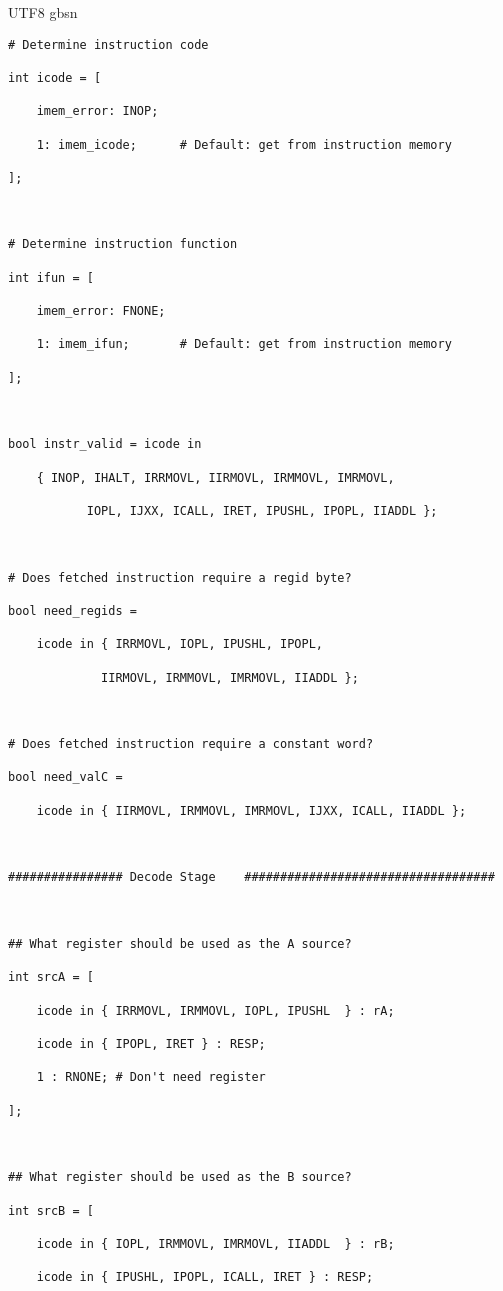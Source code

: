 \documentclass {article}
\begin{document}
\begin {CJK*} {UTF8} {gbsn}
\begin{lstlisting}
# Determine instruction code

int icode = [

	imem_error: INOP;

	1: imem_icode;		# Default: get from instruction memory

];



# Determine instruction function

int ifun = [

	imem_error: FNONE;

	1: imem_ifun;		# Default: get from instruction memory

];



bool instr_valid = icode in 

	{ INOP, IHALT, IRRMOVL, IIRMOVL, IRMMOVL, IMRMOVL,

	       IOPL, IJXX, ICALL, IRET, IPUSHL, IPOPL, IIADDL };



# Does fetched instruction require a regid byte?

bool need_regids =

	icode in { IRRMOVL, IOPL, IPUSHL, IPOPL, 

		     IIRMOVL, IRMMOVL, IMRMOVL, IIADDL };



# Does fetched instruction require a constant word?

bool need_valC =

	icode in { IIRMOVL, IRMMOVL, IMRMOVL, IJXX, ICALL, IIADDL };



################ Decode Stage    ###################################



## What register should be used as the A source?

int srcA = [

	icode in { IRRMOVL, IRMMOVL, IOPL, IPUSHL  } : rA;

	icode in { IPOPL, IRET } : RESP;

	1 : RNONE; # Don't need register

];



## What register should be used as the B source?

int srcB = [

	icode in { IOPL, IRMMOVL, IMRMOVL, IIADDL  } : rB;

	icode in { IPUSHL, IPOPL, ICALL, IRET } : RESP;


\end{lstlisting}
\end{CJK*}
\end{document}
